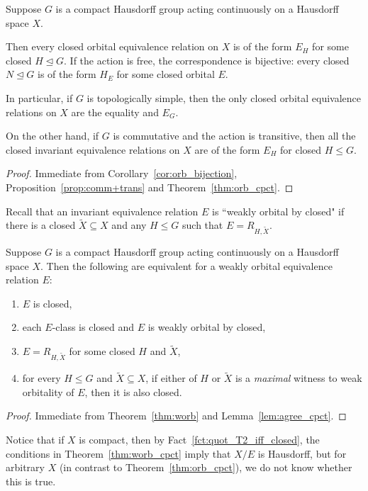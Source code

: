 	
	\begin{cor}
		\label{cor:orb_closed}
		Suppose $G$ is a compact Hausdorff group acting continuously on a Hausdorff space $X$.
		
		Then every closed orbital equivalence relation on $X$ is of the form $E_H$ for some closed $H\unlhd G$. If the action is free, the correspondence is bijective: every closed $N\unlhd G$ is of the form $H_E$ for some closed orbital $E$.
		
		In particular, if $G$ is topologically simple, then the only closed orbital equivalence relations on $X$ are the equality and $E_G$.
		
		On the other hand, if $G$ is commutative and the action is transitive, then all the closed invariant equivalence relations on $X$ are of the form $E_H$ for closed $H\leq G$.
	\end{cor}
	\begin{proof}
		Immediate from Corollary~\ref{cor:orb_bijection}, Proposition~\ref{prop:comm+trans} and Theorem~\ref{thm:orb_cpct}.
	\end{proof}
	
	
	Recall that an invariant equivalence relation $E$ is ``weakly orbital by closed" if there is a closed $\tilde X\subseteq X$ and any $H\leq G$ such that $E=R_{H,\tilde X}$.
	
	\begin{thm}
		\label{thm:worb_cpct}
		Suppose $G$ is a compact Hausdorff group acting continuously on a Hausdorff space $X$.
		Then the following are equivalent for a weakly orbital equivalence relation $E$:
		\begin{enumerate}
			\item
			$E$ is closed,
			\item
			each $E$-class is closed and $E$ is weakly orbital by closed,
			\item
			$E=R_{H,\tilde X}$ for some closed $H$ and $\tilde X$,
			\item
			for every $H\leq G$ and $\tilde X\subseteq X$, if either of $H$ or $\tilde X$ is a \emph{maximal} witness to weak orbitality of $E$, then it is also closed.
		\end{enumerate}
	\end{thm}
	\begin{proof}
		Immediate from Theorem~\ref{thm:worb} and Lemma~\ref{lem:agree_cpct}.
	\end{proof}
	
	Notice that if $X$ is compact, then by Fact~\ref{fct:quot_T2_iff_closed}, the conditions in Theorem~\ref{thm:worb_cpct} imply that $X/E$ is Hausdorff, but for arbitrary $X$ (in contrast to Theorem~\ref{thm:orb_cpct}), we do not know whether this is true.
	
